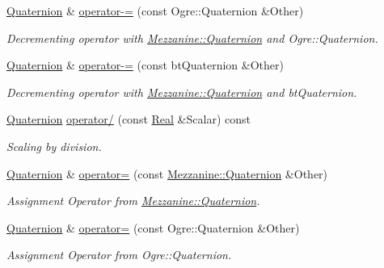 \begin{DoxyCompactItemize}
\hyperlink{classMezzanine_1_1Quaternion}{Quaternion} \& \hyperlink{classMezzanine_1_1Quaternion_a38c9468ab71721d126d3f2639b23211f}{operator-\/=} (const Ogre::Quaternion \&Other)
\begin{DoxyCompactList}\small\item\em Decrementing operator with \hyperlink{classMezzanine_1_1Quaternion}{Mezzanine::Quaternion} and Ogre::Quaternion. \item\end{DoxyCompactList}\item 
\hyperlink{classMezzanine_1_1Quaternion}{Quaternion} \& \hyperlink{classMezzanine_1_1Quaternion_a505917a83a099243cb519bc8419a74a8}{operator-\/=} (const btQuaternion \&Other)
\begin{DoxyCompactList}\small\item\em Decrementing operator with \hyperlink{classMezzanine_1_1Quaternion}{Mezzanine::Quaternion} and btQuaternion. \item\end{DoxyCompactList}\item 
\hyperlink{classMezzanine_1_1Quaternion}{Quaternion} \hyperlink{classMezzanine_1_1Quaternion_a9616681bba1d8636f369d02afd221267}{operator/} (const \hyperlink{namespaceMezzanine_a726731b1a7df72bf3583e4a97282c6f6}{Real} \&Scalar) const 
\begin{DoxyCompactList}\small\item\em Scaling by division. \item\end{DoxyCompactList}\item 
\hyperlink{classMezzanine_1_1Quaternion}{Quaternion} \& \hyperlink{classMezzanine_1_1Quaternion_a33dc0fcfb1fc97e0c0db42e1f9279783}{operator=} (const \hyperlink{classMezzanine_1_1Quaternion}{Mezzanine::Quaternion} \&Other)
\begin{DoxyCompactList}\small\item\em Assignment Operator from \hyperlink{classMezzanine_1_1Quaternion}{Mezzanine::Quaternion}. \item\end{DoxyCompactList}\item 
\hyperlink{classMezzanine_1_1Quaternion}{Quaternion} \& \hyperlink{classMezzanine_1_1Quaternion_ac3fb6756c37ff9ba6fe33d63edc6c74f}{operator=} (const Ogre::Quaternion \&Other)
\begin{DoxyCompactList}\small\item\em Assignment Operator from Ogre::Quaternion. \item\end{DoxyCompactList}\item 

\end{DoxyCompactItemize}
